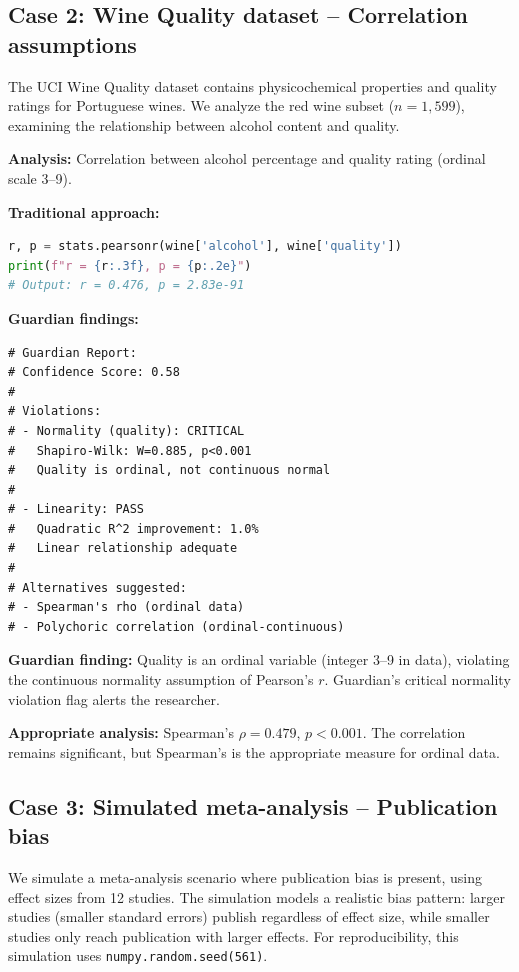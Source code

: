 \documentclass[article]{jss}
\begin{document}
\subsection{Case 2: Wine Quality dataset -- Correlation assumptions}

The UCI Wine Quality dataset \citep{cortez2009wine} contains physicochemical properties and quality ratings for Portuguese wines. We analyze the red wine subset ($n = 1{,}599$), examining the relationship between alcohol content and quality.

\textbf{Analysis:} Correlation between alcohol percentage and quality rating (ordinal scale 3--9).

\textbf{Traditional approach:}
\begin{lstlisting}[language=Python]
r, p = stats.pearsonr(wine['alcohol'], wine['quality'])
print(f"r = {r:.3f}, p = {p:.2e}")
# Output: r = 0.476, p = 2.83e-91
\end{lstlisting}

\textbf{Guardian findings:}

\begin{lstlisting}
# Guardian Report:
# Confidence Score: 0.58
#
# Violations:
# - Normality (quality): CRITICAL
#   Shapiro-Wilk: W=0.885, p<0.001
#   Quality is ordinal, not continuous normal
#
# - Linearity: PASS
#   Quadratic R^2 improvement: 1.0%
#   Linear relationship adequate
#
# Alternatives suggested:
# - Spearman's rho (ordinal data)
# - Polychoric correlation (ordinal-continuous)
\end{lstlisting}

\textbf{Guardian finding:} Quality is an ordinal variable (integer 3--9 in data), violating the continuous normality assumption of Pearson's $r$. Guardian's critical normality violation flag alerts the researcher.

\textbf{Appropriate analysis:} Spearman's $\rho = 0.479$, $p < 0.001$. The correlation remains significant, but Spearman's is the appropriate measure for ordinal data.

\subsection{Case 3: Simulated meta-analysis -- Publication bias}

We simulate a meta-analysis scenario where publication bias is present, using effect sizes from 12 studies. The simulation models a realistic bias pattern: larger studies (smaller standard errors) publish regardless of effect size, while smaller studies only reach publication with larger effects. For reproducibility, this simulation uses \texttt{numpy.random.seed(561)}.
\end{document}
